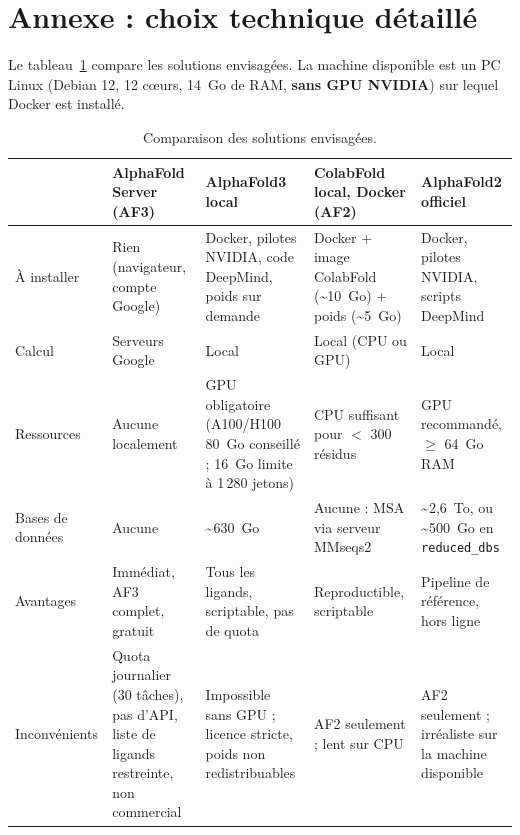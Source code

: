 \section{Annexe : choix technique détaillé}
\label{annexe:choix}

Le tableau~\ref{tab:solutions} compare les solutions envisagées. La machine disponible est un PC Linux (Debian 12, 12 cœurs, 14~Go de RAM, \textbf{sans GPU NVIDIA}) sur lequel Docker est installé.

\begin{table}[H]
\centering
\footnotesize
\begin{tabularx}{\textwidth}{>{\raggedright\arraybackslash}p{2.2cm}>{\raggedright\arraybackslash}X>{\raggedright\arraybackslash}X>{\raggedright\arraybackslash}X>{\raggedright\arraybackslash}X}
\toprule
 & \textbf{AlphaFold Server (AF3)}~\cite{alphafold_server} & \textbf{AlphaFold3 local}~\cite{alphafold3_github} & \textbf{ColabFold local, Docker (AF2)}~\cite{colabfold_github} & \textbf{AlphaFold2 officiel}~\cite{alphafold_github} \\
\midrule
À installer & Rien (navigateur, compte Google) & Docker, pilotes NVIDIA, code DeepMind, poids sur demande & Docker + image ColabFold (\textasciitilde 10~Go) + poids (\textasciitilde 5~Go) & Docker, pilotes NVIDIA, scripts DeepMind \\
Calcul & Serveurs Google & Local & Local (CPU ou GPU) & Local \\
Ressources & Aucune localement & GPU obligatoire (A100/H100 80~Go conseillé ; 16~Go limite à 1\,280 jetons) & CPU suffisant pour $<$ 300 résidus & GPU recommandé, $\geq$ 64~Go RAM \\
Bases de données & Aucune & \textasciitilde 630~Go & Aucune : MSA via serveur MMseqs2 & \textasciitilde 2,6~To, ou \textasciitilde 500~Go en \texttt{reduced\_dbs} \\
Avantages & Immédiat, AF3 complet, gratuit & Tous les ligands, scriptable, pas de quota & Reproductible, scriptable & Pipeline de référence, hors ligne \\
Inconvénients & Quota journalier (30 tâches), pas d'API, liste de ligands restreinte, non commercial & Impossible sans GPU ; licence stricte, poids non redistribuables & AF2 seulement ; lent sur CPU & AF2 seulement ; irréaliste sur la machine disponible \\
\bottomrule
\end{tabularx}
\caption{Comparaison des solutions envisagées.}
\label{tab:solutions}
\end{table}

